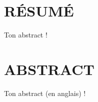 \chapter*{RÉSUMÉ}
\thispagestyle{headings}

Ton abstract !

\chapter*{ABSTRACT}
\thispagestyle{headings}

\begin{otherlanguage}{english}
Ton abstract (en anglais) !
\end{otherlanguage}
